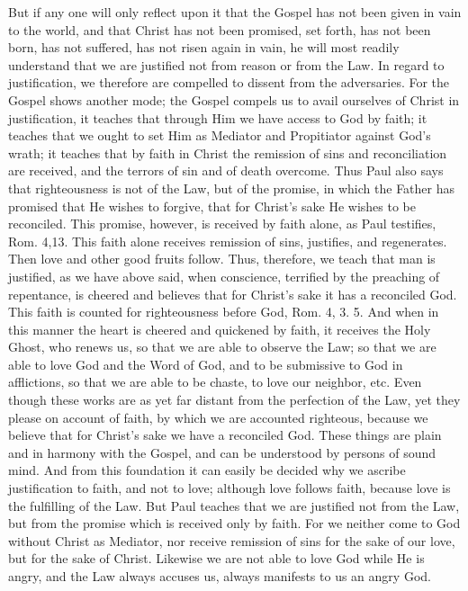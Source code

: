 But if any one will only reflect upon it that the Gospel has not been
given in vain to the world, and that Christ has not been promised,
set forth, has not been born, has not suffered, has not risen again
in vain, he will most readily understand that we are justified not
from reason or from the Law.  In regard to justification, we
therefore are compelled to dissent from the adversaries.  For the
Gospel shows another mode; the Gospel compels us to avail ourselves
of Christ in justification, it teaches that through Him we have
access to God by faith; it teaches that we ought to set Him as
Mediator and Propitiator against God's wrath; it teaches that by
faith in Christ the remission of sins and reconciliation are received,
and the terrors of sin and of death overcome.  Thus Paul also says
that righteousness is not of the Law, but of the promise, in which
the Father has promised that He wishes to forgive, that for Christ's
sake He wishes to be reconciled.  This promise, however, is received
by faith alone, as Paul testifies, Rom. 4,13. This faith alone
receives remission of sins, justifies, and regenerates.  Then love
and other good fruits follow.  Thus, therefore, we teach that man is
justified, as we have above said, when conscience, terrified by the
preaching of repentance, is cheered and believes that for Christ's
sake it has a reconciled God.  This faith is counted for
righteousness before God, Rom. 4, 3. 5. And when in this manner the
heart is cheered and quickened by faith, it receives the Holy Ghost,
who renews us, so that we are able to observe the Law; so that we are
able to love God and the Word of God, and to be submissive to God in
afflictions, so that we are able to be chaste, to love our neighbor,
etc. Even though these works are as yet far distant from the
perfection of the Law, yet they please on account of faith, by which
we are accounted righteous, because we believe that for Christ's sake
we have a reconciled God.  These things are plain and in harmony with
the Gospel, and can be understood by persons of sound mind.  And from
this foundation it can easily be decided why we ascribe justification
to faith, and not to love; although love follows faith, because love
is the fulfilling of the Law.  But Paul teaches that we are justified
not from the Law, but from the promise which is received only by
faith.  For we neither come to God without Christ as Mediator, nor
receive remission of sins for the sake of our love, but for the sake
of Christ.  Likewise we are not able to love God while He is angry,
and the Law always accuses us, always manifests to us an angry God.
